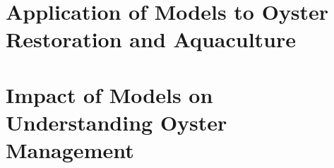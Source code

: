 \documentclass{article}
\begin{document}
\section*{Application of Models to Oyster Restoration and Aquaculture}
\label{sec:aquaculture_restoration_summary}

\section*{Impact of Models on Understanding Oyster Management}
\label{sec:impact_of_models}



\end{document}
